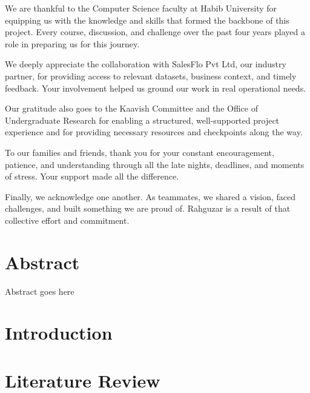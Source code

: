 \documentclass[12pt,twosided]{report}
\begin{document}
We are thankful to the Computer Science faculty at Habib University for equipping us with the knowledge and skills that formed the backbone of this project. Every course, discussion, and challenge over the past four years played a role in preparing us for this journey.

We deeply appreciate the collaboration with SalesFlo Pvt Ltd, our industry partner, for providing access to relevant datasets, business context, and timely feedback. Your involvement helped us ground our work in real operational needs.

Our gratitude also goes to the Kaavish Committee and the Office of Undergraduate Research for enabling a structured, well-supported project experience and for providing necessary resources and checkpoints along the way.

To our families and friends, thank you for your constant encouragement, patience, and understanding through all the late nights, deadlines, and moments of stress. Your support made all the difference.

Finally, we acknowledge one another. As teammates, we shared a vision, faced challenges, and built something we are proud of. Rahguzar is a result of that collective effort and commitment.



\chapter*{Abstract}
Abstract goes here

\tableofcontents
\listoffigures
\listoftables

\chapter{Introduction}
\label{chap:intro}


\chapter{Literature Review}
\label{chap:lit}

\end{document}
